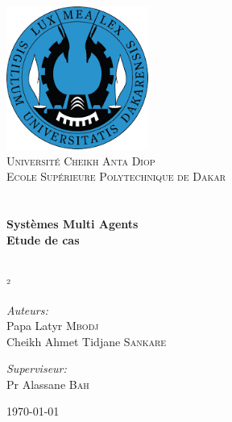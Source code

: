 \begin{titlepage}
\begin{center}

\includegraphics[width=0.35\textwidth]{./logo}~\\[1cm]
\textsc{\LARGE Université Cheikh Anta Diop }\\[1.5cm]
\textsc{\LARGE Ecole Supérieure Polytechnique de Dakar }\\[1.5cm]

\textsc{\Large }\\[0.5cm]

\HRule \\[0.4cm]

{\huge \bfseries Systèmes Multi Agents\\
Etude de cas \\[0.4cm] }

\textsc{\Large }\\[0.5cm]²
\HRule \\[1.5cm]

\begin{minipage}{0.4\textwidth}
\begin{flushleft} \large
\emph{Auteurs:}\\
Papa Latyr \textsc{Mbodj}\\
Cheikh Ahmet Tidjane \textsc{Sankare}\\
\end{flushleft}
\end{minipage}
\begin{minipage}{0.4\textwidth}
\begin{flushright} \large
\emph{Superviseur:} \\
Pr Alassane \textsc{Bah}
\end{flushright}
\end{minipage}

\vfill

{\large \today}

\end{center}
\end{titlepage}